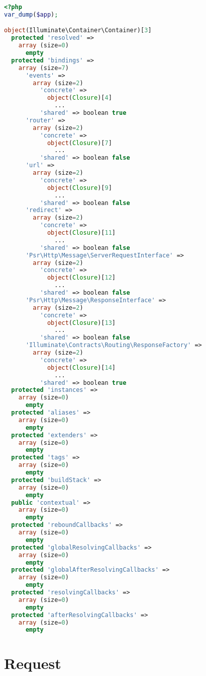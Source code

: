 \begin{lstlisting}[language=PHP]
<?php
var_dump($app);

object(Illuminate\Container\Container)[3]
  protected 'resolved' => 
    array (size=0)
      empty
  protected 'bindings' => 
    array (size=7)
      'events' => 
        array (size=2)
          'concrete' => 
            object(Closure)[4]
              ...
          'shared' => boolean true
      'router' => 
        array (size=2)
          'concrete' => 
            object(Closure)[7]
              ...
          'shared' => boolean false
      'url' => 
        array (size=2)
          'concrete' => 
            object(Closure)[9]
              ...
          'shared' => boolean false
      'redirect' => 
        array (size=2)
          'concrete' => 
            object(Closure)[11]
              ...
          'shared' => boolean false
      'Psr\Http\Message\ServerRequestInterface' => 
        array (size=2)
          'concrete' => 
            object(Closure)[12]
              ...
          'shared' => boolean false
      'Psr\Http\Message\ResponseInterface' => 
        array (size=2)
          'concrete' => 
            object(Closure)[13]
              ...
          'shared' => boolean false
      'Illuminate\Contracts\Routing\ResponseFactory' => 
        array (size=2)
          'concrete' => 
            object(Closure)[14]
              ...
          'shared' => boolean true
  protected 'instances' => 
    array (size=0)
      empty
  protected 'aliases' => 
    array (size=0)
      empty
  protected 'extenders' => 
    array (size=0)
      empty
  protected 'tags' => 
    array (size=0)
      empty
  protected 'buildStack' => 
    array (size=0)
      empty
  public 'contextual' => 
    array (size=0)
      empty
  protected 'reboundCallbacks' => 
    array (size=0)
      empty
  protected 'globalResolvingCallbacks' => 
    array (size=0)
      empty
  protected 'globalAfterResolvingCallbacks' => 
    array (size=0)
      empty
  protected 'resolvingCallbacks' => 
    array (size=0)
      empty
  protected 'afterResolvingCallbacks' => 
    array (size=0)
      empty
\end{lstlisting}


\section{Request}

